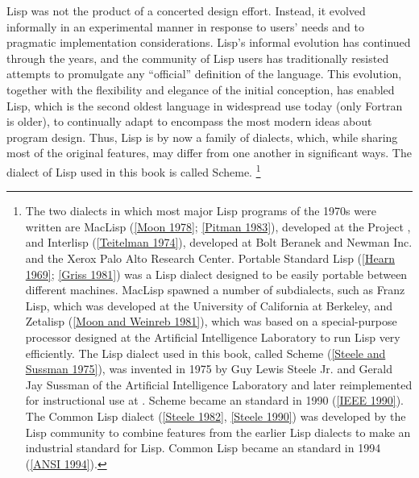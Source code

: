 Lisp was not the product of a concerted design effort.
Instead, it evolved informally in an experimental manner in response to users’ needs and to pragmatic implementation considerations.
Lisp’s informal evolution has continued through the years, and the community of Lisp users has traditionally resisted attempts to promulgate any “official” definition of the language.
This evolution, together with the flexibility and elegance of the initial conception, has enabled Lisp, which is the second oldest language in widespread use today (only Fortran is older), to continually adapt to encompass the most modern ideas about program design.
Thus, Lisp is by now a family of dialects, which, while sharing most of the original features, may differ from one another in significant ways.
The dialect of Lisp used in this book is called Scheme.%
\footnote{
	The two dialects in which most major Lisp programs of the 1970s were written are MacLisp (\cref{Moon 1978}; \cref{Pitman 1983}), developed at the  Project , and Interlisp (\cref{Teitelman 1974}), developed at Bolt Beranek and Newman Inc. and the Xerox Palo Alto Research Center.
	Portable Standard Lisp (\cref{Hearn 1969}; \cref{Griss 1981}) was a Lisp dialect designed to be easily portable between different machines.
	MacLisp spawned a number of subdialects, such as Franz Lisp, which was developed at the University of California at Berkeley, and Zetalisp (\cref{Moon and Weinreb 1981}), which was based on a special-purpose processor designed at the  Artificial Intelligence Laboratory to run Lisp very efficiently.
	The Lisp dialect used in this book, called Scheme (\cref{Steele and Sussman 1975}), was invented in 1975 by Guy Lewis Steele Jr. and Gerald Jay Sussman of the  Artificial Intelligence Laboratory and later reimplemented for instructional use at .
	Scheme became an  standard in 1990 (\cref{IEEE 1990}).
	The Common Lisp dialect (\cref{Steele 1982}, \cref{Steele 1990}) was developed by the Lisp community to combine features from the earlier Lisp dialects to make an industrial standard for Lisp.
	Common Lisp became an  standard in 1994 (\cref{ANSI 1994}).
}

